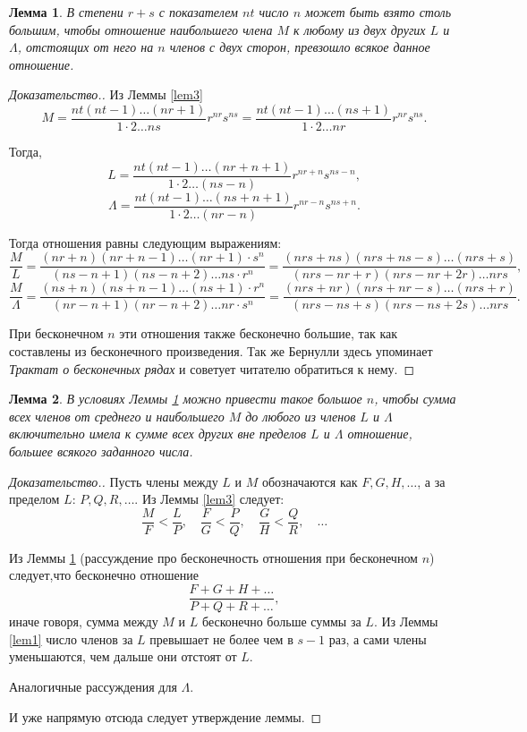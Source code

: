 \documentclass[12pt]{extarticle}
\newtheorem{lemma}{Лемма}
\begin{document}
\begin{lemma} \label{lem4}
В степени $r+s$ с показателем $nt$ число $n$ может быть взято столь большим, чтобы отношение наибольшего члена $M$ к любому из двух других $L$ и $\Lambda$, отстоящих от него на $n$ членов с двух сторон, превзошло всякое данное отношение.
\end{lemma}
\begin{proof}[Доказательство.]
Из Леммы \ref{lem3} $$M = \frac{nt (nt-1) \dots (nr+1)}{1 \cdot 2 \dots ns} r^{nr} s^{ns} = 
\frac{nt (nt-1) \dots (ns+1)}{1 \cdot 2 \dots nr} r^{nr} s^{ns}.$$

Тогда, $$L = \frac{nt (nt-1) \dots (nr+n+1)}{1 \cdot 2 \dots (ns-n)} r^{nr+n} s^{ns-n},$$
$$\Lambda = \frac{nt (nt-1) \dots (ns+n+1)}{1 \cdot 2 \dots (nr-n)} r^{nr-n} s^{ns+n}.$$

Тогда отношения равны следующим выражениям:
$$\frac{M}{L} = \frac{(nr+n) (nr+n -1) \dots (nr+1) \cdot s^n}{(ns-n + 1) (ns-n+2) \dots ns \cdot r^n}= \frac{(nrs+ns) (nrs+ns-s) \dots (nrs+s)}{(nrs-nr+r) (nrs-nr+2r) \dots nrs},$$
$$\frac{M}{\Lambda} = \frac{(ns+n) (ns+n -1) \dots (ns+1) \cdot r^n}{(nr-n + 1) (nr-n+2) \dots nr \cdot s^n}= \frac{(nrs+nr) (nrs+nr-s) \dots (nrs+r)}{(nrs-ns+s) (nrs-ns+2s) \dots nrs}.$$

При бесконечном $n$ эти отношения также бесконечно большие, так как составлены из бесконечного произведения. 
Так же Бернулли здесь упоминает \textit{Трактат о бесконечных рядах} и советует читателю обратиться к нему.
\end{proof}

\begin{lemma} \label{lem5}
В условиях Леммы \ref{lem4} можно привести такое большое $n$, чтобы сумма всех членов от среднего и наибольшего $M$ до любого из членов $L$ и $\Lambda$ включительно имела к сумме всех других вне пределов $L$ и $\Lambda$ отношение, большее всякого заданного числа.
\end{lemma}
\begin{proof}[Доказательство.]
Пусть члены между $L$ и $M$ обозначаются как $F, G, H, \dots$, а за пределом $L$: $P, Q, R, \dots$.
Из Леммы \ref{lem3} следует:
$$\frac{M}{F} < \frac{L}{P}, \quad \frac{F}{G} < \frac{P}{Q}, \quad \frac{G}{H} < \frac{Q}{R}, \quad \dots$$

Из Леммы \ref{lem4} (рассуждение про бесконечность отношения при бесконечном $n$) следует,что бесконечно отношение
$$\frac{F+G+H+\dots}{P+Q+R+\dots},$$
иначе говоря, сумма между $M$ и $L$ бесконечно больше суммы за $L$.
Из Леммы \ref{lem1} число членов за $L$ превышает не более чем в $s-1$ раз, а сами члены уменьшаются, чем дальше они отстоят от $L$.

Аналогичные рассуждения для $\Lambda$.

И уже напрямую отсюда следует утверждение леммы.
\end{proof}
\end{document}
